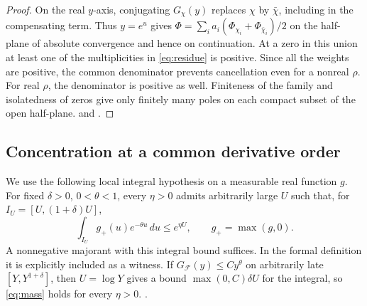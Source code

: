 \begin{proof}
On the real \(y\)-axis, conjugating \(G_\chi(y)\) replaces \(\chi\) by \(\bar\chi\), including in the compensating term. Thus \(y=e^u\) gives \(\Phi=\sum_i a_i(\Phi_{\chi_i}+\Phi_{\bar\chi_i})/2\) on the half-plane of absolute convergence and hence on continuation. At a zero in this union at least one of the multiplicities in \eqref{eq:residue} is positive. Since all the weights are positive, the common denominator prevents cancellation even for a nonreal \(\rho\). For real \(\rho\), the denominator is positive as well. Finiteness of the family and isolatedness of zeros give only finitely many poles on each compact subset of the open half-plane.  and .
\end{proof}

\subsection{Concentration at a common derivative order}
We use the following local integral hypothesis on a measurable real function \(g\). For fixed \(\delta>0\), \(0<\theta<1\), every \(\eta>0\) admits arbitrarily large \(U\) such that, for \(I_U=[U,(1+\delta)U]\),
\begin{equation}\label{eq:mass}
 \int_{I_U}g_+(u)e^{-\theta u}\,du\le e^{\eta U},\qquad g_+=\max(g,0).
\end{equation}
A nonnegative majorant with this integral bound suffices. In the formal definition it is explicitly included as a witness. If \(G_{\mathcal F}(y)\le C y^\theta\) on arbitrarily late \([Y,Y^{1+\delta}]\), then \(U=\log Y\) gives a bound \(\max(0,C)\delta U\) for the integral, so \eqref{eq:mass} holds for every \(\eta>0\). .

